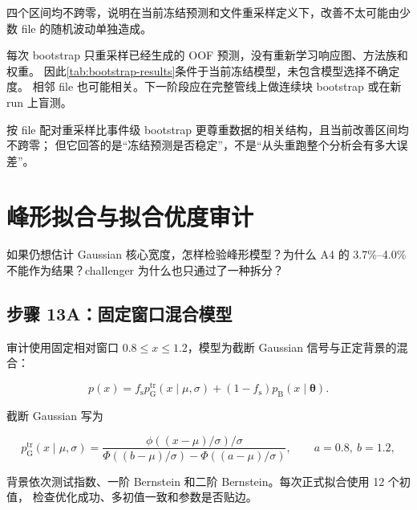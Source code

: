 \documentclass[UTF8,12pt,a4paper,oneside,fontset=none]{ctexart}
\numberwithin{equation}{section}
\begin{document}
四个区间均不跨零，说明在当前冻结预测和文件重采样定义下，改善不太可能由少数 file 的随机波动单独造成。

\begin{warningbox}[title={这是条件区间，不是完整流程误差}]
每次 bootstrap 只重采样已经生成的 OOF 预测，没有重新学习响应图、方法族和权重。
因此\cref{tab:bootstrap-results}条件于当前冻结模型，未包含模型选择不确定度。
相邻 file 也可能相关。下一阶段应在完整管线上做连续块 bootstrap 或在新 run 上盲测。
\end{warningbox}

\begin{conclusionbox}
按 file 配对重采样比事件级 bootstrap 更尊重数据的相关结构，且当前改善区间均不跨零；
但它回答的是“冻结预测是否稳定”，不是“从头重跑整个分析会有多大误差”。
\end{conclusionbox}

\section{峰形拟合与拟合优度审计}

\begin{questionbox}
如果仍想估计 Gaussian 核心宽度，怎样检验峰形模型？为什么 A4 的 3.7\%--4.0\% 不能作为结果？challenger 为什么也只通过了一种拆分？
\end{questionbox}

\subsection{步骤 13A：固定窗口混合模型}

审计使用固定相对窗口 \(0.8\le x\le1.2\)，模型为截断 Gaussian 信号与正定背景的混合：

\begin{equation}
p(x)
=
f_{\mathrm s}p_{\mathrm G}^{\mathrm{tr}}(x\mid\mu,\sigma)
+(1-f_{\mathrm s})p_{\mathrm B}(x\mid\symbf{\theta}).
\label{eq:mixture-model}
\end{equation}

截断 Gaussian 写为

\begin{equation}
p_{\mathrm G}^{\mathrm{tr}}(x\mid\mu,\sigma)
=
\frac{
\phi\!\left((x-\mu)/\sigma\right)/\sigma
}{
\Phi\!\left((b-\mu)/\sigma\right)
-\Phi\!\left((a-\mu)/\sigma\right)
},
\qquad a=0.8,\ b=1.2,
\label{eq:truncated-gaussian}
\end{equation}

背景依次测试指数、一阶 Bernstein 和二阶 Bernstein。每次正式拟合使用 12 个初值，
检查优化成功、多初值一致和参数是否贴边。
\end{document}
